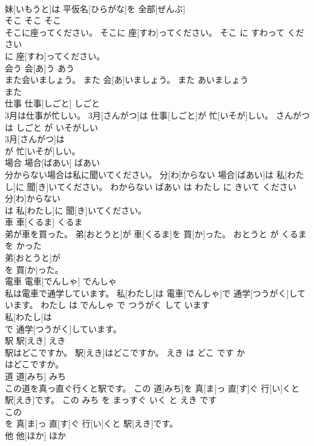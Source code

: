 \documentclass[8pt]{extreport}
\begin{document}
\begin{CJK}{UTF8}{min}
\\	妹[いもうと]は 平仮名[ひらがな]を 全部[ぜんぶ]
\\	そこ	そこ	そこ	
\\	そこに座ってください。	そこに 座[すわ]ってください。	そこ に すわって ください	
\\	に 座[すわ]ってください。		
\\	会う	会[あ]う	あう	
\\	また会いましょう。	また 会[あ]いましょう。	また あいましょう	
\\	また
\\	仕事	仕事[しごと]	しごと	
\\	3月は仕事が忙しい。	3月[さんがつ]は 仕事[しごと]が 忙[いそが]しい。	さんがつ は しごと が いそがしい	
\\	3月[さんがつ]は
\\	が 忙[いそが]しい。		
\\	場合	場合[ばあい]	ばあい	
\\	分からない場合は私に聞いてください。	分[わ]からない 場合[ばあい]は 私[わたし]に 聞[き]いてください。	わからない ばあい は わたし に きいて ください	
\\	分[わ]からない
\\	は 私[わたし]に 聞[き]いてください。		
\\	車	車[くるま]	くるま	
\\	弟が車を買った。	弟[おとうと]が 車[くるま]を 買[か]った。	おとうと が くるま を かった	
\\	弟[おとうと]が
\\	を 買[か]った。		
\\	電車	電車[でんしゃ]	でんしゃ	
\\	私は電車で通学しています。	私[わたし]は 電車[でんしゃ]で 通学[つうがく]しています。	わたし は でんしゃ で つうがく して います	
\\	私[わたし]は
\\	で 通学[つうがく]しています。		
\\	駅	駅[えき]	えき	
\\	駅はどこですか。	駅[えき]はどこですか。	えき は どこ です か	
\\	はどこですか。		
\\	道	道[みち]	みち	
\\	この道を真っ直ぐ行くと駅です。	この 道[みち]を 真[ま]っ 直[す]ぐ 行[い]くと 駅[えき]です。	この みち を まっすぐ いく と えき です	
\\	この
\\	を 真[ま]っ 直[す]ぐ 行[い]くと 駅[えき]です。		
\\	他	他[ほか]	ほか	

\end{CJK}
\end{document}
